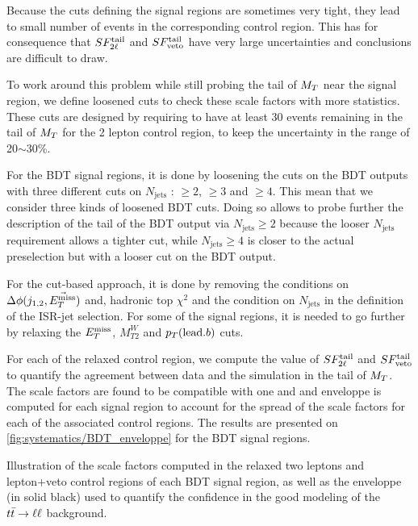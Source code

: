             Because the cuts defining the signal regions are sometimes very tight, they lead to
            small number of events in the corresponding control region. This has for consequence that
            $SF_{2\ell}^{\text{tail}}$ and $SF_{\text{veto}}^{\text{tail}}$ have very large uncertainties and conclusions are
            difficult to draw.

            To work around this problem while still probing the tail of $M_T$ near the signal
            region, we define loosened cuts to check these scale factors with more statistics.
            These cuts are designed by requiring to have at least 30 events remaining in the tail of
            $M_T$ for the 2 lepton control region, to keep the uncertainty in the range of 20$\sim$30\%.
            
            For the BDT signal regions, it is done by loosening the cuts on the BDT outputs with
            three different cuts on $N_\text{jets}$ : $\geq 2$, $\geq 3$ and $\geq 4$. This mean
            that we consider three kinds of loosened BDT cuts. Doing so allows to probe further the
            description of the tail of the BDT output via $N_\text{jets} \geq 2$ because the looser
            $N_\text{jets}$ requirement allows a tighter cut, while $N_\text{jets} \geq 4$ is closer
            to the actual preselection but with a looser cut on the BDT output. 

            For the cut-based approach, it is done by removing the conditions on $\Delta \phi( j_{1,2},
            \vec{E_T^\text{miss}} )$ and, hadronic top $\chi^2$ and the condition on $N_\text{jets}$ in the definition
            of the ISR-jet selection. For some of the signal regions, it is needed to go further by 
            relaxing the $E_T^\text{miss}$, $M_{T2}^W$ and $p_T(\text{lead.} b)$ cuts. 

            For each of the relaxed control region, we compute the value of $SF_{2\ell}^{\text{tail}}$ and
            $SF_{\text{veto}}^{\text{tail}}$ to quantify the agreement between data and the simulation in the tail of $M_T$.
            The scale factors are found to be compatible with one and and enveloppe is computed for
            each signal region to account for the spread of the scale factors for each of the
            associated control regions. The results are presented on \ref{fig:systematics/BDT_enveloppe} for
            the BDT signal regions.

                         {Illustration of the scale factors computed in the relaxed two leptons and lepton+veto control regions of each BDT signal region, as well as the enveloppe (in solid black) used to quantify the confidence in the good modeling of the $t\bar{t} \rightarrow \ell \ell$ background.}

